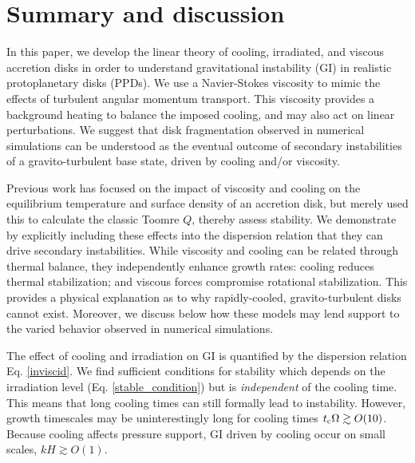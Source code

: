 \section{Summary and discussion}\label{summary}
In this paper, we develop the linear theory of cooling, irradiated, 
and viscous accretion disks in order to understand gravitational 
instability (GI) in realistic protoplanetary disks (PPDs). 
We use a Navier-Stokes viscosity to mimic the effects of
turbulent angular momentum transport. 
This viscosity provides a background heating to balance the imposed cooling,  
and may also act on linear perturbations. %
We suggest that disk fragmentation observed in numerical simulations  
can be understood as the eventual outcome of secondary
instabilities of a gravito-turbulent base state, driven by cooling
and/or viscosity. 


Previous work has focused on the impact of viscosity and 
cooling on the equilibrium temperature and surface density of an 
accretion disk, but merely used this to calculate  the classic Toomre $Q$,
thereby assess stability. %
We demonstrate by explicitly including these effects into the
dispersion relation that they can drive secondary instabilities.
While viscosity and cooling can be related through thermal
balance, they independently enhance growth rates: cooling reduces
thermal stabilization; and viscous forces compromise rotational
stabilization. This provides a physical explanation as to why
rapidly-cooled, gravito-turbulent disks cannot exist. Moreover, we discuss below how
these models may lend support to the varied behavior observed in numerical simulations.


The effect of cooling and irradiation on GI is quantified by the 
dispersion relation Eq. \ref{inviscid}. 
We find sufficient conditions for stability which  
depends on the irradiation level (Eq. \ref{stable_condition}) but is 
\emph{independent} of the cooling time. 
This means that long cooling times can still  
formally lead to instability. However, growth timescales may be 
uninterestingly long for cooling times $t_\mathrm{c}\Omega\gtrsim 
O(10)$. Because cooling affects pressure support, GI driven by cooling
occur on small scales, $kH\gtrsim O(1)$.   

